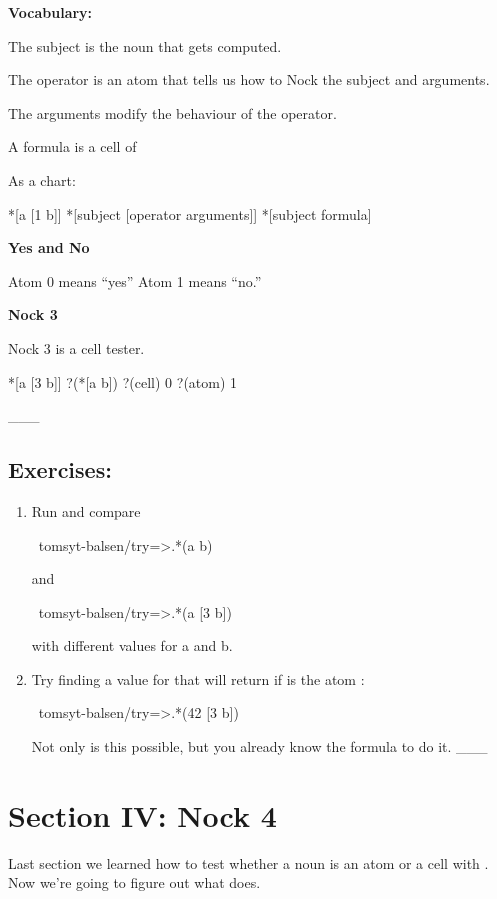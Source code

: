 \textbf{Vocabulary:}

The subject is the noun that gets computed.

The operator is an atom that tells us how to Nock the subject and arguments.

The arguments modify the behaviour of the operator.

A formula is a cell of 

As a chart:
\begin{code}
*[a [1 b]] 
*[subject [operator arguments]]
*[subject formula]
\end{code}
\textbf{Yes and No}

Atom 0 means ``yes'' 
Atom 1 means ``no.'' 

\textbf{Nock 3}

Nock 3 is a cell tester.
\begin{code}
*[a [3 b]]         ?(*[a b])
?(cell)            0
?(atom)            1
\end{code}
\_\_\_

\subsection{Exercises:}

\begin{enumerate}
\item Run and compare
\begin{code}
~tomsyt-balsen/try=>.*(a b)
\end{code}
 and 
\begin{code}
~tomsyt-balsen/try=>.*(a [3 b])
\end{code}
 with different values for a and b.
\item Try finding a value for  that will return  if  is the atom :
\begin{code}
~tomsyt-balsen/try=>.*(42 [3 b])
\end{code}
 Not only is this possible, but you already know the formula to do it.
\_\_\_
\end{enumerate}

\section{Section IV: Nock 4}

Last section we learned how to test whether a noun is an atom or a cell with
. Now we're going to figure out what  does.

